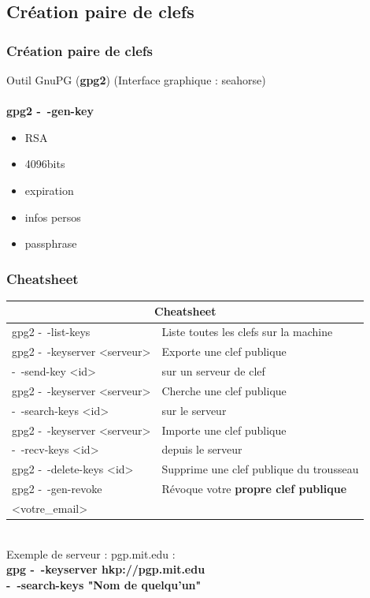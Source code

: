 \documentclass{beamer}
\begin{document}
\subsection{Création paire de clefs}
\begin{frame}
\frametitle{Création paire de clefs}
\vspace*{-0.5cm}
Outil GnuPG (\textbf{gpg2}) \hspace*{2.5cm} ({\color{gray}Interface graphique : seahorse})\\~\\
\textbf{gpg2 -~-gen-key}
\begin{itemize}
\item RSA 
\item 4096bits
\item expiration
\item infos persos
\item passphrase
\end{itemize}
\end{frame}

\begin{frame}
\frametitle{Cheatsheet}
    \begin{tabular}{ | l | l |}
    \hline
    \multicolumn{2}{|c|}{Cheatsheet} \\ \hline
    gpg2 -~-list-keys & Liste toutes les clefs sur la machine \\ \hline
    gpg2 -~-keyserver <serveur>  & Exporte une clef publique \\  
    -~-send-key <id> & sur un serveur de clef\\ \hline
    gpg2 -~-keyserver <serveur> & Cherche une clef publique \\
    -~-search-keys <id> & sur le serveur \\ \hline
    gpg2 -~-keyserver <serveur> & Importe une clef publique \\
     -~-recv-keys <id> &  depuis le serveur\\ \hline 
    gpg2 -~-delete-keys <id> &  Supprime une clef publique du trousseau\\  \hline
    gpg2 -~-gen-revoke & Révoque votre \textbf{propre clef publique}\\
     <votre\_email> & \\
     \hline
    \end{tabular}  
    ~\\  
    Exemple de serveur : pgp.mit.edu  : \\
    \textbf{gpg -~-keyserver hkp://pgp.mit.edu \\-~-search-keys "Nom de quelqu'un"}
\end{frame}
\end{document}
